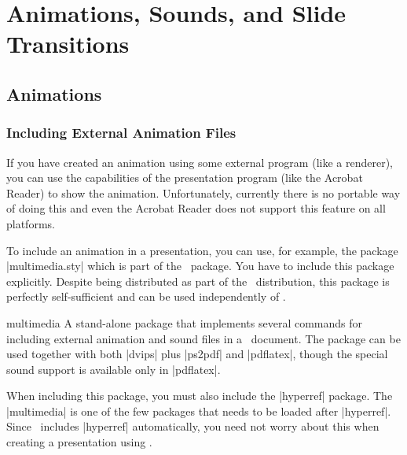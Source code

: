 %
%
%

\section{Animations, Sounds, and Slide Transitions}


\subsection{Animations}

\subsubsection{Including External Animation Files}
\label{section-multimedia}

If you have created an animation using some external program (like a renderer), you can use the capabilities of the presentation program (like the Acrobat Reader) to show the animation. Unfortunately, currently there is no portable way of doing this and even the Acrobat Reader does not support this feature on all platforms.

To include an animation in a presentation, you can use, for example, the package |multimedia.sty| which is part of the \beamer\ package. You have to include this package explicitly. Despite being distributed as part of the \beamer\ distribution, this package is perfectly self-sufficient and can be used independently of \beamer.

\begin{package}{{multimedia}}
  A stand-alone package that implements several commands for including external animation and sound files in a \pdf\ document. The package can be used together with both |dvips| plus |ps2pdf| and |pdflatex|, though the special sound support is available only in |pdflatex|.

  When including this package, you must also include the |hyperref| package. The |multimedia| is one of the few packages that needs to be loaded after |hyperref|. Since \beamer\ includes |hyperref| automatically, you need not worry about this when creating a presentation using \beamer.
\end{package}

